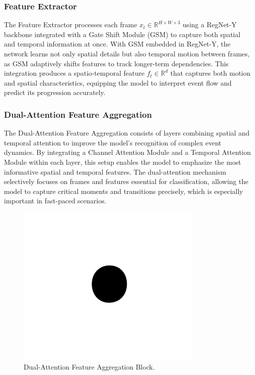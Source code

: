 \documentclass[conference]{IEEEtran}
\begin{document}
\subsubsection{Feature Extractor}
The Feature Extractor processes each frame \( x_t \in \mathbb{R}^{H \times W \times 3} \) using a RegNet-Y backbone integrated with a Gate Shift Module (GSM) to capture both spatial and temporal information at once. With GSM embedded in RegNet-Y, the network learns not only spatial details but also temporal motion between frames, as GSM adaptively shifts features to track longer-term dependencies. This integration produces a spatio-temporal feature \( f_t \in \mathbb{R}^d \) that captures both motion and spatial characteristics, equipping the model to interpret event flow and predict its progression accurately.

\subsubsection{Dual-Attention Feature Aggregation}
The Dual-Attention Feature Aggregation consists of layers combining spatial and temporal attention to improve the model’s recognition of complex event dynamics. By integrating a Channel Attention Module and a Temporal Attention Module within each layer, this setup enables the model to emphasize the most informative spatial and temporal features. The dual-attention mechanism selectively focuses on frames and features essential for classification, allowing the model to capture critical moments and transitions precisely, which is especially important in fast-paced scenarios.

\begin{figure}[htbp]
    \centerline{\includegraphics{figures/fig1.png}}
    \caption{Dual-Attention Feature Aggregation Block.}
    \label{fig2}
\end{figure}
\end{document}
